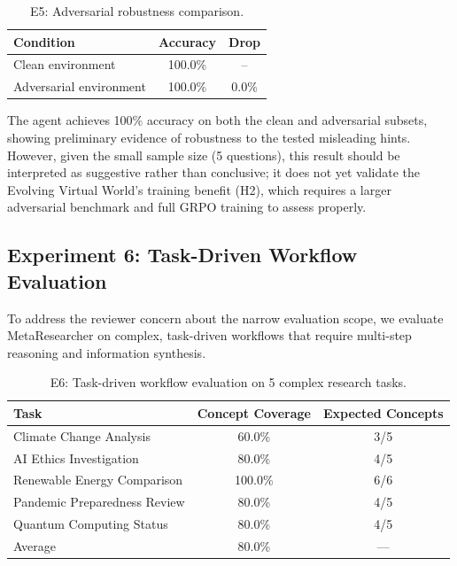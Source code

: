 \documentclass[notspecified,article,accept,pdftex,moreauthors]{Definitions/mdpi}
\renewcommand{\textbf}[1]{#1}
\begin{document}
\begin{table}[H]
\centering
\caption{E5: Adversarial robustness comparison.}
\label{tab:e5_robustness}
\renewcommand{\arraystretch}{1.1}
\begin{tabular}{lcc}
\toprule
\textbf{Condition} & \textbf{Accuracy} & \textbf{Drop} \\
\midrule
Clean environment & 100.0\% & -- \\
Adversarial environment & 100.0\% & \textbf{0.0\%} \\
\bottomrule
\end{tabular}
\end{table}

The agent achieves 100\% accuracy on both the clean and adversarial subsets, showing preliminary evidence of robustness to the tested misleading hints. However, given the small sample size (5 questions), this result should be interpreted as suggestive rather than conclusive; it does not yet validate the Evolving Virtual World's training benefit (H2), which requires a larger adversarial benchmark and full GRPO training to assess properly.

\subsection{Experiment 6: Task-Driven Workflow Evaluation}
\label{sec:e6}
To address the reviewer concern about the narrow evaluation scope, we evaluate MetaResearcher on complex, task-driven workflows that require multi-step reasoning and information synthesis.

\begin{table}[H]
\centering
\caption{E6: Task-driven workflow evaluation on 5 complex research tasks.}
\label{tab:e6_tasks}
\renewcommand{\arraystretch}{1.1}
\begin{tabular}{lcc}
\toprule
\textbf{Task} & \textbf{Concept Coverage} & \textbf{Expected Concepts} \\
\midrule
Climate Change Analysis & 60.0\% & 3/5 \\
AI Ethics Investigation & 80.0\% & 4/5 \\
Renewable Energy Comparison & 100.0\% & 6/6 \\
Pandemic Preparedness Review & 80.0\% & 4/5 \\
Quantum Computing Status & 80.0\% & 4/5 \\
\midrule
\textbf{Average} & \textbf{80.0\%} & \textbf{—} \\
\bottomrule
\end{tabular}
\end{table}
\end{document}

